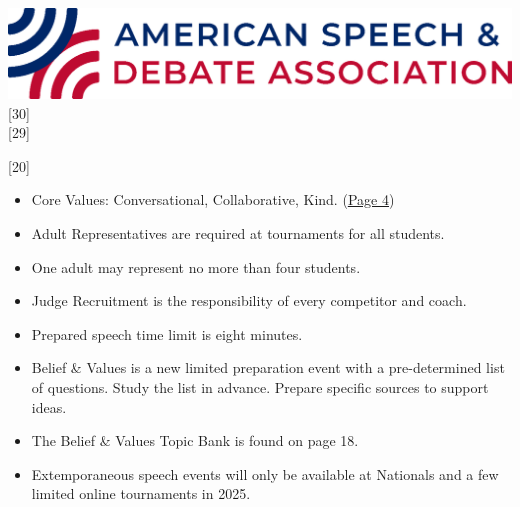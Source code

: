\documentclass[11pt]{memoir}    %
\def\lowspacing{9pt}
\def\regspacing{19pt}
\def\hispacing{20pt}
\begin{document}
\thispagestyle{CoverStyle}
\addtocounter{page}{-1}

\begin{center}
    \begin{vplace}[0.4]
        \includegraphics[width=0.9815\linewidth,keepaspectratio]{Images/TitlePageLogo.png}\vspace{\hispacing}
        [30]\vspace{\lowspacing}\\
        [29]
    \end{vplace}
\end{center}

\newpage


[20]



\begin{itemize}
    \item Core Values: Conversational, Collaborative, Kind. (\textcolor{blue}{\uline{\hyperref[subsec:CoreValues]{Page 4}}})
    \item Adult Representatives are required at tournaments for all students.
    \item One adult may represent no more than four students.
    \item Judge Recruitment is the responsibility of every competitor and coach.
\end{itemize}\vspace{\regspacing}

\label{subsec:SpeechEventChanges}
\noindent{}

\begin{itemize}
    \item Prepared speech time limit is eight minutes.
    \item Belief \& Values is a new limited preparation event with a pre-determined list of questions. Study the list in advance. Prepare specific sources to support ideas.
    \item The Belief \& Values Topic Bank is found on page 18.
    \item Extemporaneous speech events will only be available at Nationals and a few limited online tournaments in 2025.
\end{itemize}\vspace{\regspacing}
\end{document}
